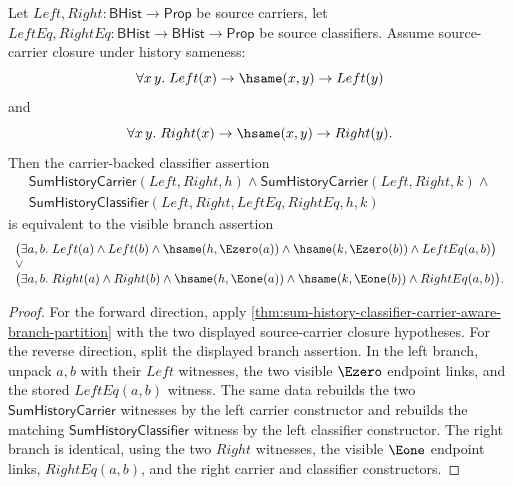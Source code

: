 \begin{theorem}
\label{thm:sum-history-classifier-carrier-aware-branch-exactness}
Let $Left,Right:\mathsf{BHist}\to\mathsf{Prop}$ be source carriers, let
$LeftEq,RightEq:\mathsf{BHist}\to\mathsf{BHist}\to\mathsf{Prop}$ be source
classifiers. Assume source-carrier closure under history sameness:
$$
\forall x\,y.\; Left(x)\to \hsame(x,y)\to Left(y)
$$
and
$$
\forall x\,y.\; Right(x)\to \hsame(x,y)\to Right(y).
$$
Then the carrier-backed classifier assertion
$$
\begin{array}{l}
\mathsf{SumHistoryCarrier}(Left,Right,h)\land
\mathsf{SumHistoryCarrier}(Left,Right,k)\land\\
\mathsf{SumHistoryClassifier}(Left,Right,LeftEq,RightEq,h,k)
\end{array}
$$
is equivalent to the visible branch assertion
$$
\begin{array}{l}
\bigl(\exists a,b.\; Left(a)\land Left(b)\land
\hsame(h,\Ezero(a))\land \hsame(k,\Ezero(b))\land LeftEq(a,b)\bigr)\\
\lor\\
\bigl(\exists a,b.\; Right(a)\land Right(b)\land
\hsame(h,\Eone(a))\land \hsame(k,\Eone(b))\land RightEq(a,b)\bigr).
\end{array}
$$
\end{theorem}
\begin{proof}
For the forward direction, apply
\autoref{thm:sum-history-classifier-carrier-aware-branch-partition} with the
two displayed source-carrier closure hypotheses. For the reverse direction,
split the displayed branch assertion. In the left branch, unpack $a,b$ with
their $Left$ witnesses, the two visible $\Ezero$ endpoint links, and the stored
$LeftEq(a,b)$ witness. The same data rebuilds the two
$\mathsf{SumHistoryCarrier}$ witnesses by the left carrier constructor and
rebuilds the matching $\mathsf{SumHistoryClassifier}$ witness by the left
classifier constructor. The right branch is identical, using the two $Right$
witnesses, the visible $\Eone$ endpoint links, $RightEq(a,b)$, and the right
carrier and classifier constructors.
\end{proof}


